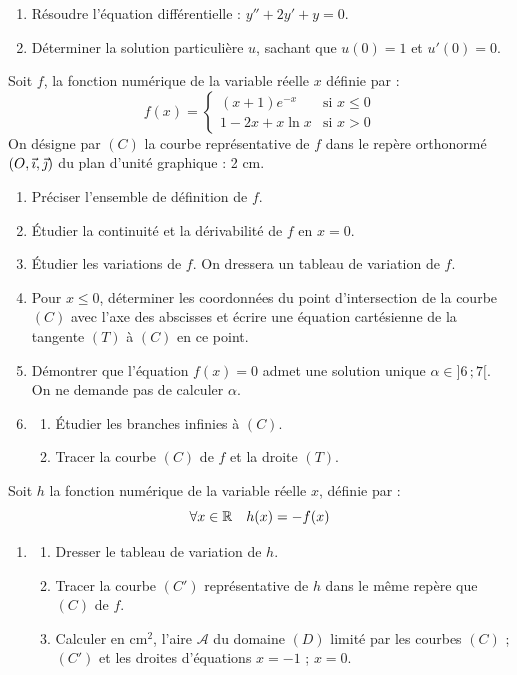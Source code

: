\documentclass[11pt]{article}
\begin{document}

\begin{enumerate}
  \item Résoudre l'équation différentielle : $y'' + 2y' + y = 0$.
  \item Déterminer la solution particulière $u$, sachant que $u(0) = 1$ et $u'(0) = 0$.
\end{enumerate}

Soit $f$, la fonction numérique de la variable réelle $x$ définie par :
\[ f(x) = \begin{cases} (x + 1)e^{-x} & \text{si } x \le 0 \\[0.5ex] 1 - 2x + x\ln x & \text{si } x > 0 \end{cases} \]
On désigne par $(C)$ la courbe représentative de $f$ dans le repère orthonormé $(O,\vec{\imath},\vec{\jmath})$ du plan d'unité graphique : 2 cm.

\begin{enumerate}[start=3]
  \item Préciser l'ensemble de définition de $f$.
  \item Étudier la continuité et la dérivabilité de $f$ en $x = 0$.
  \item Étudier les variations de $f$. On dressera un tableau de variation de $f$.
  \item Pour $x \le 0$, déterminer les coordonnées du point d'intersection de la courbe $(C)$ avec l'axe des abscisses et écrire une équation cartésienne de la tangente $(T)$ à $(C)$ en ce point.
  \item Démontrer que l'équation $f(x) = 0$ admet une solution unique $\alpha \in ]6\,;7[$. On ne demande pas de calculer $\alpha$.
  \item \begin{enumerate}[label=\alph*.]
    \item Étudier les branches infinies à $(C)$.
    \item Tracer la courbe $(C)$ de $f$ et la droite $(T)$.
  \end{enumerate}
\end{enumerate}

Soit $h$ la fonction numérique de la variable réelle $x$, définie par :
\[ \forall x \in \mathbb{R} \quad h(x) = -f(x) \]

\begin{enumerate}[start=9]
  \item \begin{enumerate}[label=\alph*.]
    \item Dresser le tableau de variation de $h$.
    \item Tracer la courbe $(C')$ représentative de $h$ dans le même repère que $(C)$ de $f$.
    \item Calculer en cm$^2$, l'aire $\mathcal{A}$ du domaine $(D)$ limité par les courbes $(C)$ ; $(C')$ et les droites d'équations $x = -1$ ; $x = 0$.
  \end{enumerate}
\end{enumerate}
\end{document}
